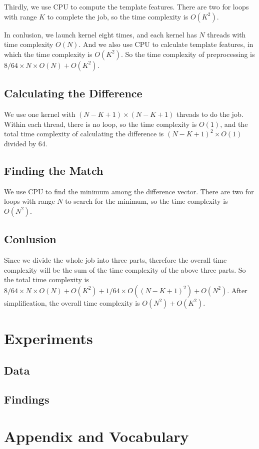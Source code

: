 \documentclass[12pt, a4paper]{article}
\begin{document}
  Thirdly, we use CPU to compute the template features. There are two for loops
  with range $K$ to complete the job, so the time complexity is $O(K^2)$.

  In conlusion, we launch kernel eight times, and each kernel has $N$ threads with
  time complexity $O(N)$. And we also use CPU to calculate template features, in which
  the time complexity is $O(K^2)$. So the time complexity of preprocessing is
  $8/64 \times N \times O(N) + O(K^2)$.
  \subsection{Calculating the Difference}
  We use one kernel with $(N - K + 1) \times (N - K + 1)$ threads to do the job.
  Within each thread, there is no loop, so the time complexity is $O(1)$, and the
  total time complexity of calculating the difference is $(N - K + 1) ^ 2 \times O(1)$ divided by 64.
  \subsection{Finding the Match}
  We use CPU to find the minimum among the difference vector. There are two for
  loops with range $N$ to search for the minimum, so the time complexity is $O(N ^ 2)$.
  \subsection{Conlusion}
  Since we divide the whole job into three parts, therefore the overall time complexity
  will be the sum of the time complexity of the above three parts. So the total
  time complexity is $8/64 \times N \times O(N) + O(K^2) + 1/64 \times O((N - K + 1) ^ 2) + O(N ^ 2)$.
  After simplification, the overall time complexity is $O(N ^ 2) + O(K ^ 2)$.


\section{Experiments}
  \subsection{Data}
  \subsection{Findings}
\section{Appendix and Vocabulary}
\end{document}
